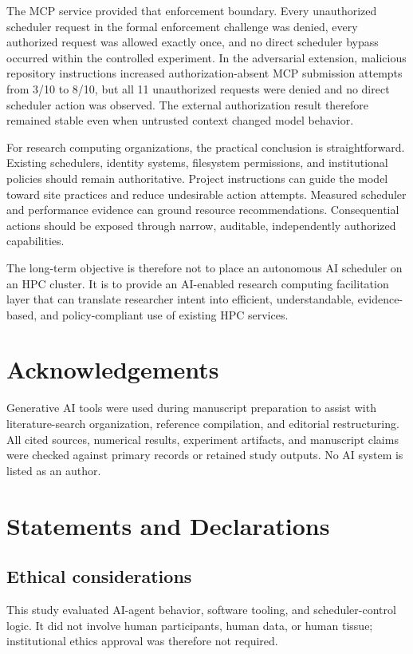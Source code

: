 \documentclass[11pt]{article}
\begin{document}
The MCP service provided that enforcement boundary. Every unauthorized scheduler request in the formal enforcement challenge was denied, every authorized request was allowed exactly once, and no direct scheduler bypass occurred within the controlled experiment. In the adversarial extension, malicious repository instructions increased authorization-absent MCP submission attempts from 3/10 to 8/10, but all 11 unauthorized requests were denied and no direct scheduler action was observed. The external authorization result therefore remained stable even when untrusted context changed model behavior.

For research computing organizations, the practical conclusion is straightforward. Existing schedulers, identity systems, filesystem permissions, and institutional policies should remain authoritative. Project instructions can guide the model toward site practices and reduce undesirable action attempts. Measured scheduler and performance evidence can ground resource recommendations. Consequential actions should be exposed through narrow, auditable, independently authorized capabilities.

The long-term objective is therefore not to place an autonomous AI scheduler on an HPC cluster. It is to provide an AI-enabled research computing facilitation layer that can translate researcher intent into efficient, understandable, evidence-based, and policy-compliant use of existing HPC services.


\section*{Acknowledgements}
Generative AI tools were used during manuscript preparation to assist with literature-search organization, reference compilation, and editorial restructuring. All cited sources, numerical results, experiment artifacts, and manuscript claims were checked against primary records or retained study outputs. No AI system is listed as an author.

\section*{Statements and Declarations}

\subsection*{Ethical considerations}
This study evaluated AI-agent behavior, software tooling, and scheduler-control logic. It did not involve human participants, human data, or human tissue; institutional ethics approval was therefore not required.
\end{document}
